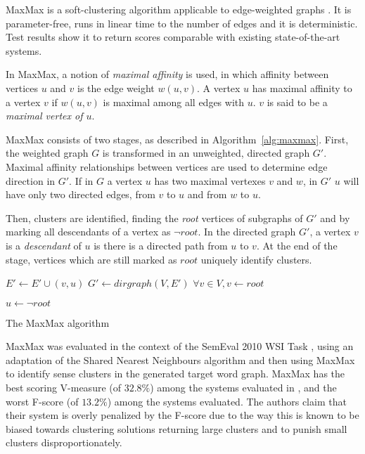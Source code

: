 MaxMax is a soft-clustering algorithm applicable to edge-weighted graphs
\cite{hope2013maxmax}. It is parameter-free, runs in linear time to the number
of edges and it is deterministic. Test results show it to return scores
comparable with existing state-of-the-art systems.

In MaxMax, a notion of \textit{maximal affinity} is used, in which affinity
between vertices $u$ and $v$ is the edge weight $w(u,v)$. A vertex $u$ has
maximal affinity to a vertex $v$ if $w(u,v)$ is maximal among all edges with
$u$. $v$ is said to be a \textit{maximal vertex of $u$}.

MaxMax consists of two stages, as described in Algorithm~\ref{alg:maxmax}.
First, the weighted graph $G$ is transformed in an unweighted, directed graph
$G'$. Maximal affinity relationships between vertices are used to determine edge
direction in $G'$. If in $G$ a vertex $u$ has two maximal vertexes $v$ and $w$,
in $G'$ $u$ will have only two directed edges, from $v$ to $u$ and from $w$ to
$u$.

Then, clusters are identified, finding the \textit{root} vertices of subgraphs
of $G'$ and by marking all descendants of a vertex as $\neg root$. In the
directed graph $G'$, a vertex $v$ is a \textit{descendant} of $u$ is there is a
directed path from $u$ to $v$. At the end of the stage, vertices which are still
marked as $root$ uniquely identify clusters.

\begin{algorithm}
 \begin{algorithmic}
     \State $E' \gets E' \cup (v,u)$
    \EndIf
   \EndFor
   \State $G' \gets dirgraph(V, E')$
   \State $\forall v \in V, v \gets root$

      \State $u \gets \neg root$
     \EndFor
    \EndIf
   \EndFor
  \EndFunction
 \end{algorithmic}
 \caption{\label{alg:maxmax} The MaxMax algorithm}
\end{algorithm}

MaxMax was evaluated in the context of the SemEval 2010 \ac{WSI} Task
\cite{manandhar2010semeval}, using an adaptation of the Shared Nearest
Neighbours algorithm and then using MaxMax to identify sense clusters in the
generated target word graph. MaxMax has the best scoring V-measure (of $32.8\%$)
among the systems evaluated in \cite{manandhar2010semeval}, and the worst
F-score (of $13.2\%$) among the systems evaluated. The authors claim that their
system is overly penalized by the F-score due to the way this is known to be
biased towards clustering solutions returning large clusters and to punish small
clusters disproportionately.

